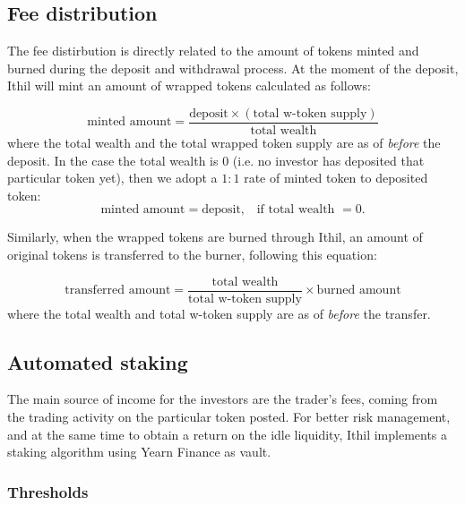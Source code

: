 \documentclass [10pt, fancyhdr, twoside] {article}
\begin{document}
\subsection{Fee distribution}\label{feeDistributionSubsection}

The fee distirbution is directly related to the amount of tokens minted and burned during the deposit and withdrawal process. At the moment of the deposit, Ithil will mint an amount of wrapped tokens calculated as follows:

\begin{equation}\label{mintedAmount}
\text{minted amount} = \frac{\text{deposit} \times (\text{total w-token supply})}{\text{total wealth}}
\end{equation}
where the total wealth and the total wrapped token supply are as of \textit{before} the deposit. In the case the total wealth is $0$ (i.e. no investor has deposited that particular token yet), then we adopt a $1:1$ rate of minted token to deposited token: 
\begin{equation}\label{mintedAmountZeroWealth}
\text{minted amount} = \text{deposit,} \ \ \ \text{ if total wealth } = 0.
\end{equation}

Similarly, when the wrapped tokens are burned through Ithil, an amount of original tokens is transferred to the burner, following this equation:

\begin{equation}\label{transferEq}
\text{transferred amount} = \frac{ \text{total wealth}}{\text{total w-token supply}} \times\text{burned amount}
\end{equation}
where the total wealth and total w-token supply are as of \textit{before} the transfer.

\subsection{Automated staking}\label{automatedStakingSubsection}

The main source of income for the investors are the trader's fees, coming from the trading activity on the particular token posted. For better risk management, and at the same time to obtain a return on the idle liquidity, Ithil implements a staking algorithm using Yearn Finance as vault.

\subsubsection{Thresholds}
\end{document}

